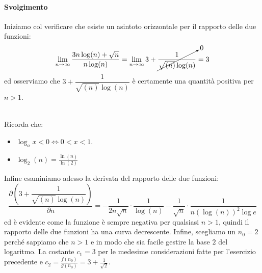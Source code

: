 \documentclass[11pt,a4paper,oneside]{article}
\begin{document}
\paragraph*{Svolgimento} Iniziamo col verificare che esiste un asintoto orizzontale per il rapporto delle due funzioni:
$$\lim_{n \to \infty} \dfrac{3n\log(n)+ \sqrt{n}}{n\log(n)} = \lim_{n \to \infty} 3 + \cancelto{0}{\dfrac{1}{\sqrt{(n)}\log(n)}}=3$$
ed osserviamo che $3 + \dfrac{1}{\sqrt{(n)}\log(n)}$ è certamente una quantità positiva per $n>1$.\\\\
\begin{tcolorbox}[title=Alcune proprietà dei logaritmi]
	Ricorda che:
	\begin{itemize}
		\item $\log_{a} x < 0 \Leftrightarrow 0 < x < 1$.
		\item $\log_2(n) = \frac{\ln(n)}{\ln(2)}$
	\end{itemize}
\end{tcolorbox}
Infine esaminiamo adesso la derivata del rapporto delle due funzioni:
$$\dfrac{\partial \left(3 + \dfrac{1}{\sqrt{(n)}\log(n)} \right)}{\partial n} =-\frac{1}{2n\sqrt{n}}\cdot\frac{1}{\log(n)} - \frac{1}{\sqrt{n}} \cdot \frac{1}{n(\log(n))^2\log{e}} $$
ed è evidente come la funzione è sempre negativa per qualsiasi $n > 1$, quindi il rapporto delle due funzioni ha una curva decrescente.
Infine, scegliamo un $n_0 = 2$ perché sappiamo che $n > 1$ e in modo che sia facile gestire la base $2$ del logaritmo. La costante $c_1 = 3$ per le medesime considerazioni fatte per l'esercizio precedente e $c_2 = \frac{f(n_0)}{g(n_0)} = 3 + \frac{1}{\sqrt{2}}$.
\end{document}
